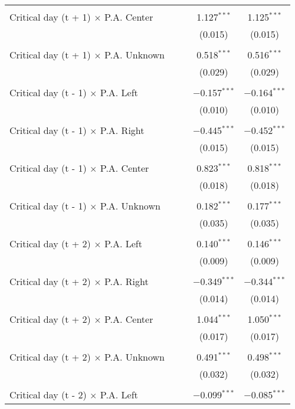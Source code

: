 \documentclass[
]{article}
\begin{document}
\begin{table}[!htbp]
{\begin{tabular}{@{\extracolsep{5pt}}lcccc}
  & & & & \\ 
 Critical day (t + 1) $\times$ P.A. Center &  &  & 1.127$^{***}$ & 1.125$^{***}$ \\ 
  &  &  & (0.015) & (0.015) \\ 
  & & & & \\ 
 Critical day (t + 1) $\times$ P.A. Unknown &  &  & 0.518$^{***}$ & 0.516$^{***}$ \\ 
  &  &  & (0.029) & (0.029) \\ 
  & & & & \\ 
 Critical day (t - 1) $\times$ P.A. Left &  &  & $-$0.157$^{***}$ & $-$0.164$^{***}$ \\ 
  &  &  & (0.010) & (0.010) \\ 
  & & & & \\ 
 Critical day (t - 1) $\times$ P.A. Right &  &  & $-$0.445$^{***}$ & $-$0.452$^{***}$ \\ 
  &  &  & (0.015) & (0.015) \\ 
  & & & & \\ 
 Critical day (t - 1) $\times$ P.A. Center &  &  & 0.823$^{***}$ & 0.818$^{***}$ \\ 
  &  &  & (0.018) & (0.018) \\ 
  & & & & \\ 
 Critical day (t - 1) $\times$ P.A. Unknown &  &  & 0.182$^{***}$ & 0.177$^{***}$ \\ 
  &  &  & (0.035) & (0.035) \\ 
  & & & & \\ 
 Critical day (t + 2) $\times$ P.A. Left &  &  & 0.140$^{***}$ & 0.146$^{***}$ \\ 
  &  &  & (0.009) & (0.009) \\ 
  & & & & \\ 
 Critical day (t + 2) $\times$ P.A. Right &  &  & $-$0.349$^{***}$ & $-$0.344$^{***}$ \\ 
  &  &  & (0.014) & (0.014) \\ 
  & & & & \\ 
 Critical day (t + 2) $\times$ P.A. Center &  &  & 1.044$^{***}$ & 1.050$^{***}$ \\ 
  &  &  & (0.017) & (0.017) \\ 
  & & & & \\ 
 Critical day (t + 2) $\times$ P.A. Unknown &  &  & 0.491$^{***}$ & 0.498$^{***}$ \\ 
  &  &  & (0.032) & (0.032) \\ 
  & & & & \\ 
 Critical day (t - 2) $\times$ P.A. Left &  &  & $-$0.099$^{***}$ & $-$0.085$^{***}$ \\ 

\end{tabular}}
\end{table}
\end{document}
